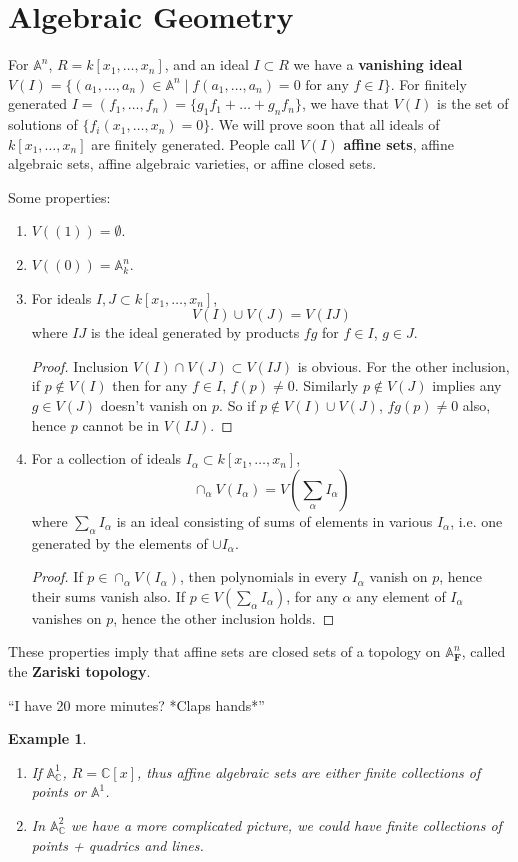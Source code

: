 \documentclass[12pt]{article}
\newcommand{\F}{\mathbf{F}}
\newcommand{\C}{\mathbb{C}}
\newcommand{\A}{\mathbb{A}}
\newtheorem*{example}{Example}
\begin{document}
\section{Algebraic Geometry}
    For $\A^n$, $R = k[x_1, \dots, x_n]$, and an ideal $I \subset R$ we have a \textbf{vanishing ideal} $V(I) = \{(a_1, \dots, a_n) \in \A^n \mid f(a_1, \dots, a_n) = 0 \text{ for any } f \in I\}$. For finitely generated $I = (f_1,\dots, f_n) = \{g_1f_1 + \dots + g_nf_n\}$, we have that $V(I)$ is the set of solutions of $\{f_i(x_1, \dots, x_n) = 0\}$. We will prove soon that all ideals of $k[x_1, \dots, x_n]$ are finitely generated. People call $V(I)$ \textbf{affine sets}, affine algebraic sets, affine algebraic varieties, or affine closed sets. \par 
    Some properties: 
    \begin{enumerate}
        \item $V((1)) = \emptyset$.
        \item $V((0)) = \A^n_k$.
        \item For ideals $I, J \subset k[x_1, \dots, x_n]$, 
        $$V(I) \cup V(J) = V(IJ)$$
        where $IJ$ is the ideal generated by products $fg$ for $f \in I$, $g \in J$. 
        \begin{proof}
            Inclusion $V(I) \cap V(J) \subset V(IJ)$ is obvious. For the other inclusion, if $p \not \in V(I)$ then for any $f \in I$, $f(p) \neq 0$. Similarly $p \not \in V(J)$ implies any $g \in V(J)$ doesn't vanish on $p$. So if $p \not \in V(I) \cup V(J)$, $fg(p) \neq 0$ also, hence $p$ cannot be in $V(IJ)$.
        \end{proof}
        \item For a collection of ideals $I_\alpha \subset k[x_1, \dots, x_n]$, 
        $$\cap_\alpha V(I_\alpha) = V(\sum_\alpha I_\alpha)$$
        where $\sum_\alpha I_\alpha$ is an ideal consisting of sums of elements in various $I_\alpha$, i.e. one generated by the elements of $\cup I_\alpha$.
        \begin{proof}
            If $p \in \cap_\alpha V(I_\alpha)$, then polynomials in every $I_\alpha$ vanish on $p$, hence their sums vanish also. If $p \in V(\sum_\alpha I_\alpha)$, for any $\alpha$ any element of $I_\alpha$ vanishes on $p$, hence the other inclusion holds.  
        \end{proof}
    \end{enumerate}
    These properties imply that affine sets are closed sets of a topology on $\A^n_\F$, called the \textbf{Zariski topology}. \par 
    ``I have 20 more minutes? *Claps hands*''\par 
    \begin{example}
        \begin{enumerate}
            \item If $\A_\C^1$, $R = \C[x]$, thus affine algebraic sets are either finite collections of points or $\A^1$.
            \item In $\A^2_\C$ we have a more complicated picture, we could have finite collections of points + quadrics and lines. 
        \end{enumerate}
    \end{example}
\end{document}
